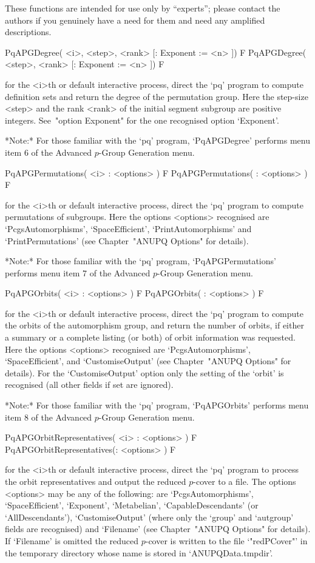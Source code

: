 These functions are intended for use only by ``experts''; please  contact
the authors if you genuinely have a need for them and need any  amplified
descriptions.

\>PqAPGDegree( <i>, <step>, <rank> [: Exponent := <n> ]) F
\>PqAPGDegree( <step>, <rank> [: Exponent := <n> ]) F

for the <i>th or default interactive {\ANUPQ} process,  direct  the  `pq'
program  to  compute  definition  sets  and  return  the  degree  of   the
permutation group. Here the step-size <step> and the rank <rank>  of  the
initial segment subgroup are positive integers. See~"option Exponent" for
the one recognised option `Exponent'.

*Note:* For those familiar with the `pq' program,  `PqAPGDegree'  performs
menu item 6 of the Advanced $p$-Group Generation menu.

\>PqAPGPermutations( <i> : <options> ) F
\>PqAPGPermutations( : <options> ) F

for the <i>th or default interactive {\ANUPQ} process,  direct  the  `pq'
program to compute permutations of subgroups. Here the  options  <options>
recognised       are        `PcgsAutomorphisms',        `SpaceEfficient',
`PrintAutomorphisms' and `PrintPermutations' (see Chapter~"ANUPQ Options"
for details).

*Note:* For those familiar  with  the  `pq'  program,  `PqAPGPermutations'
performs menu item 7 of the Advanced $p$-Group Generation menu.

\>PqAPGOrbits( <i> : <options> ) F
\>PqAPGOrbits( : <options> ) F

for the  <i>th or default  interactive {\ANUPQ} process, direct  the `pq'
program to compute  the orbits of the automorphism  group, and return the
number of orbits, if either a  summary or a complete listing (or both) of
orbit information  was requested.  Here the options  <options> recognised
are  `PcgsAutomorphisms',  `SpaceEfficient',  and `CustomiseOutput'  (see
Chapter~"ANUPQ  Options" for details).  For the  `CustomiseOutput' option
only the  setting of the `orbit'  is recognised (all other  fields if set
are ignored).

*Note:* For those familiar with the `pq' program,  `PqAPGOrbits'  performs
menu item 8 of the Advanced $p$-Group Generation menu.

\>PqAPGOrbitRepresentatives( <i> : <options> ) F
\>PqAPGOrbitRepresentatives(: <options> ) F

for the <i>th or default interactive {\ANUPQ} process,  direct  the  `pq'
program to process  the  orbit  representatives  and  output  the  reduced
$p$-cover to a file. The options <options> may be any of  the  following:
are  `PcgsAutomorphisms',  `SpaceEfficient',  `Exponent',   `Metabelian',
`CapableDescendants' (or `AllDescendants'), `CustomiseOutput' (where only
the `group' and `autgroup' fields are  recognised)  and  `Filename'  (see
Chapter~"ANUPQ Options"  for  details).  If  `Filename'  is  omitted  the
reduced $p$-cover is written to the file `"redPCover"' in  the  temporary
directory whose name is stored in `ANUPQData.tmpdir'.

